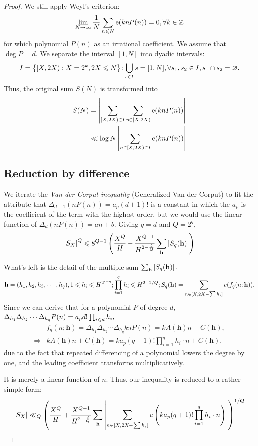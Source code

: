 \begin{proof}
We still apply Weyl's criterion: $$\lim_{N \rightarrow \infty} \frac{1}{N} \sum_{n \leqslant N} \operatorname{e} \! \left( knP(n) \right) = 0, \forall k \in \mathbb{Z}$$ for which polynomial $P(n)$ as an irrational coefficient. We assume that $\deg P = d.$ We separate the interval $[1,N]$ into dyadic intervals: $$I = \left\{ [X, 2X): X = 2^k, 2X \leqslant N \right\}; \bigcup_{s \in I}s = [1,N], \forall s_1, s_2 \in I, s_1 \cap s_2 = \varnothing.$$ Thus, the original sum $S(N)$ is transformed into 
\begin{align*}
    S(N) &= \left\lvert \sum_{[X, 2X) \in I} \sum_{n \in [X, 2X)} \operatorname{e} \! \left( knP(n) \right) \right\rvert \\
    &\ll \log N \left\lvert \sum_{n \in [X, 2X) \in I} \operatorname{e} \! \left( knP(n) \right) \right\rvert
\end{align*}

\subsection{Reduction by difference}
We iterate the \emph{Van der Corput inequality} (Generalized Van der Corput) to fit the attribute that $\Delta_{d+1}(nP(n)) = a_p(d+1)!$ is a constant in which the $a_p$ is the coefficient of the term with the highest order, but we would use the linear function of $\Delta_d (nP(n)) = an+b.$ Giving $q = d$ and $Q = 2^q,$ $$\left\lvert S_X \right\rvert^Q \leqslant 8^{Q-1} \left( \frac{X^Q}{H} + \frac{X^{Q-1}}{H^{2-\frac{2}{Q}}} \sum_{\mathbf{h}} \left\lvert S_q(\mathbf{h}) \right\rvert \right)$$

What's left is the detail of the multiple sum $\sum_{\mathbf{h}} \left\lvert S_q(\mathbf{h}) \right\rvert.$ $$\mathbf{h} = (h_1,h_2,h_3, \cdots ,h_q), 1 \leqslant h_i \leqslant H^{2^{i-q}}; \prod_{i=1}^q h_i\leqslant H^{2-2/Q}; S_q(\mathbf{h}) = \sum_{n \in [X,2X-\sum h_i]} e(f_q(n;\mathbf{h})).$$ Since we can derive that for a polynomial $P$ of degree $d,$ $\Delta_{h_1}\Delta_{h_2} \cdots \Delta_{h_q} P(n) = a_p d! \prod_{i \leqslant d} h_i,$ 
\begin{align*}
    &f_q(n;\mathbf{h}) = \Delta_{h_1}\Delta_{h_2} \cdots \Delta_{h_q} knP(n) = kA(\mathbf{h})n+C(\mathbf{h}), \\
    \Longrightarrow &k A(\mathbf{h})n+C(\mathbf{h}) = ka_p (q+1)! \prod_{i=1}^q h_i \cdot n+ C(\mathbf{h}).
\end{align*}
due to the fact that repeated differencing of a polynomial lowers the degree by one, and the leading coefficient transforms multiplicatively.

It is merely a linear function of $n.$ Thus, our inequality is reduced to a rather simple form: $$\left\lvert S_X \right\rvert \ll_Q \left( \frac{X^Q}{H} + \frac{X^{Q-1}}{H^{2-\frac{2}{Q}}} \sum_{\mathbf{h}} \left\lvert \sum_{n \in [X,2X-\sum h_i]} e\left( ka_p (q+1)! \prod_{i=1}^q h_i \cdot n \right) \right\rvert \right)^{1/Q}$$ 


\end{proof}
